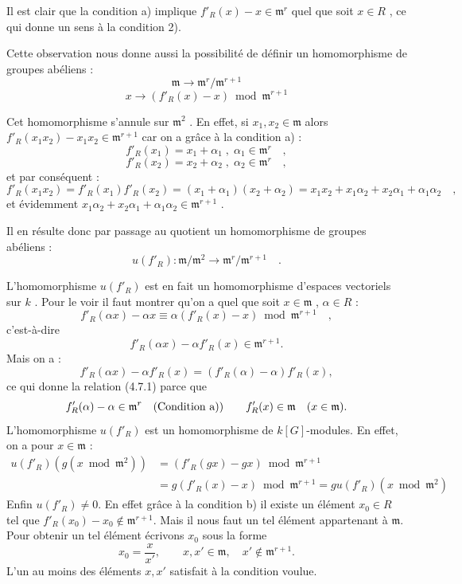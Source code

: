 \documentclass[11pt]{article}
\providecommand{\fm}{\mathfrak{m}}
\providecommand{\fm}{\mathfrak m}
\begin{document}
Il est clair que la condition a) implique $f'_R(x) - x \in \fm^r$ quel que soit $x \in R$ , ce qui donne un sens à la condition 2).

Cette observation nous donne aussi la possibilité de définir un homomorphisme de groupes abéliens :
\[
\fm \longrightarrow \fm^r/\fm^{r+1}
\]
\[
x \longrightarrow (f'_R(x) - x) \bmod \fm^{r+1}
\]

Cet homomorphisme s'annule sur $\fm^2$ . En effet, si $x_1, x_2 \in \fm$ alors $f'_R(x_1x_2) - x_1x_2 \in \fm^{r+1}$ car on a grâce à la condition a) :
\[
f'_R(x_1) = x_1 + \alpha_1 \; , \; \alpha_1 \in \fm^r \quad ,
\]
\[
f'_R(x_2) = x_2 + \alpha_2 \; , \; \alpha_2 \in \fm^r \quad ,
\]
et par conséquent :
\[
f'_R(x_1x_2) = f'_R(x_1)f'_R(x_2) = (x_1 + \alpha_1)(x_2 + \alpha_2) = x_1x_2 + x_1\alpha_2 + x_2\alpha_1 + \alpha_1\alpha_2 \quad ,
\]
et évidemment $x_1\alpha_2 + x_2\alpha_1 + \alpha_1\alpha_2 \in \fm^{r+1}$ .

Il en résulte donc par passage au quotient un homomorphisme de groupes abéliens :
\[
u(f'_R) : \fm/\fm^2 \longrightarrow \fm^r/\fm^{r+1} \quad .
\]

L'homomorphisme $u(f'_R)$ est en fait un homomorphisme d'espaces vectoriels sur $k$ . Pour le voir il faut montrer qu'on a quel que soit $x \in \fm$ , $\alpha \in R$ :
\[
f'_R(\alpha x) - \alpha x \equiv \alpha(f'_R(x) - x) \bmod \fm^{r+1} \quad ,
\]
c'est-à-dire
\begin{equation}
\tag{4.7.1}
f'_R(\alpha x)-\alpha f'_R(x)\in\fm^{r+1}.
\end{equation}
Mais on a :
\[
f'_R(\alpha x)-\alpha f'_R(x)=(f'_R(\alpha)-\alpha)f'_R(x),
\]
ce qui donne la relation (4.7.1) parce que
\[
f'_R(\alpha)-\alpha\in\fm^r\quad\hbox{(Condition a))}
\qquad
f'_R(x)\in\fm\quad (x\in\fm).
\]
L'homomorphisme $u(f'_R)$ est un homomorphisme de $k[G]$-modules. En effet, on a pour $x\in\fm$ :
\[
\begin{aligned}
u(f'_R)(g(x\bmod\fm^2))
&=(f'_R(gx)-gx)\bmod\fm^{r+1}\\
&=g(f'_R(x)-x)\bmod\fm^{r+1}
=gu(f'_R)(x\bmod\fm^2)
\end{aligned}
\]
Enfin $u(f'_R)\ne0$. En effet grâce à la condition b) il existe un élément $x_0\in R$ tel que $f'_R(x_0)-x_0\notin\fm^{r+1}$. Mais il nous faut un tel élément appartenant à $\fm$. Pour obtenir un tel élément écrivons $x_0$ sous la forme
\[
x_0=\frac{x}{x'},\qquad x,x'\in\fm,\quad x'\notin\fm^{r+1}.
\]
L'un au moins des éléments $x,x'$ satisfait à la condition voulue.
\end{document}
